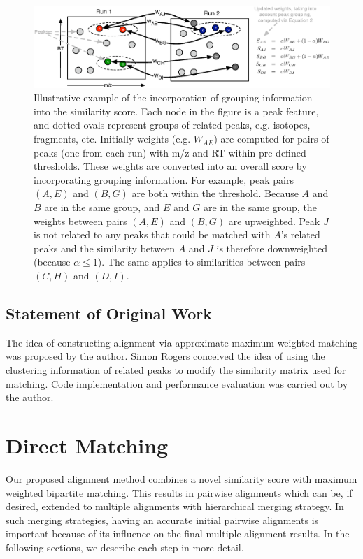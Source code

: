 \begin{figure}[!htbp]
\centering\includegraphics[width=1\linewidth]{04-matching/figures/figure_1.eps}
\centering\caption{\label{fig:computingweight} Illustrative example of the incorporation of grouping information into the similarity score. Each node in the figure is a peak feature, and dotted ovals represent groups of related peaks, e.g. isotopes, fragments, etc. Initially weights (e.g. $W_{AE}$) are computed for pairs of peaks (one from each run) with m/z and RT within pre-defined thresholds. These weights are converted into an overall score by incorporating grouping information. For example, peak pairs $(A,E)$ and $(B,G)$ are both within the threshold. Because $A$ and $B$ are in the same group, and $E$ and $G$ are in the same group, the weights between pairs $(A,E)$ and $(B,G)$ are upweighted. Peak $J$ is not related to any peaks that could be matched with $A$'s related peaks and the similarity between $A$ and $J$ is therefore downweighted (because $\alpha\leq 1$). The same applies to similarities between pairs $(C,H)$ and $(D,I)$.}
\end{figure}

\subsection*{Statement of Original Work}

The idea of constructing alignment via approximate maximum weighted matching was proposed by the author. Simon Rogers conceived the idea of using the clustering information of related peaks to modify the similarity matrix used for matching. Code implementation and performance evaluation was carried out by the author. 

\section{Direct Matching\label{sub:direct-matching}}

Our proposed alignment method combines a novel similarity score with maximum weighted bipartite matching. This results in pairwise alignments which can be, if desired, extended to multiple alignments with hierarchical merging strategy. In such merging strategies, having an accurate initial pairwise alignments is important because of its influence on the final multiple alignment results. In the following sections, we describe each step in more detail.

